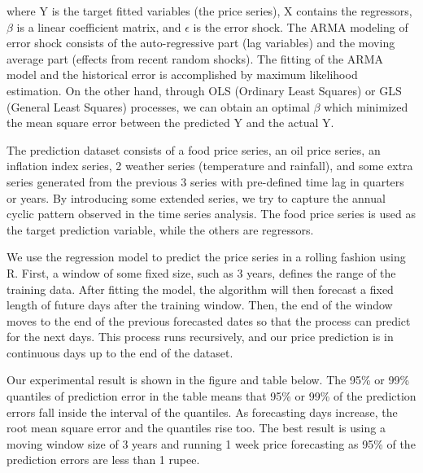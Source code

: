 where Y is the target fitted variables (the price series), X contains the regressors, $\beta$ is a linear coefficient matrix, and $\epsilon$ is the error shock. The ARMA modeling of error shock consists of the auto-regressive part (lag variables) and the moving average part (effects from recent random shocks). The fitting of the ARMA model and the historical error is accomplished by maximum likelihood estimation. On the other hand, through OLS (Ordinary Least Squares) or GLS (General Least Squares) processes, we can obtain an optimal $\beta$ which minimized the mean square error between the predicted Y and the actual Y.

The prediction dataset consists of a food price series, an oil price series, an inflation index series, 2 weather series (temperature and rainfall), and some extra series generated from the previous 3 series with pre-defined time lag in quarters or years. By introducing some extended series, we try to capture the annual cyclic pattern observed in the time series analysis. The food price series is used as the target prediction variable, while the others are regressors.

We use the regression model to predict the price series in a rolling fashion using R. First, a window of some fixed size, such as 3 years, defines the range of the training data. After fitting the model, the algorithm will then forecast a fixed length of future days after the training window. Then, the end of the window moves to the end of the previous forecasted dates so that the process can predict for the next days. This process runs recursively, and our price prediction is in continuous days up to the end of the dataset.

Our experimental result is shown in the figure and table below. The 95\% or 99\% quantiles of prediction error in the table means that 95\% or 99\% of the prediction errors fall inside the interval of the quantiles. As forecasting days increase, the root mean square error and the quantiles rise too. The best result is using a moving window size of 3 years and running 1 week price forecasting as 95\% of the prediction errors are less than 1 rupee.

